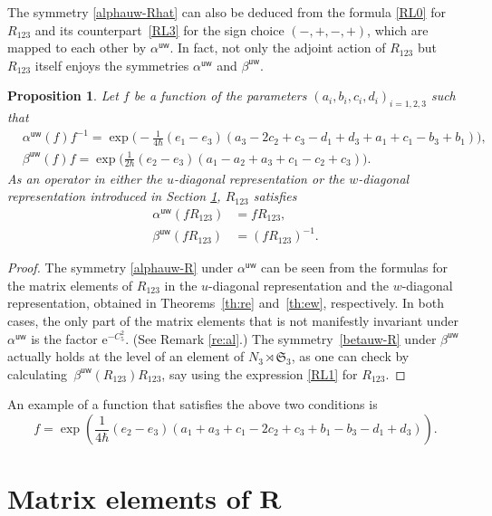 \documentclass[pdftex]{sigma}
\newcommand{\e}{{\mathrm e}}
\newcommand{\uu}{{\mathsf u}}
\newcommand{\ww}{{\mathsf w}}
\numberwithin{equation}{section}
\newtheorem{Proposition}[Theorem]{Proposition}
 { \theoremstyle{definition}
\newtheorem{Example}[Theorem]{Example}
\newtheorem{Remark}[Theorem]{Remark} }
\begin{document}
The symmetry \eqref{alphauw-Rhat} can also be deduced from the formula
\eqref{RL0} for $R_{123}$ and its counterpart~\eqref{RL3} for the sign
choice $(-,+,-,+)$, which are mapped to each other by $\alpha^{\uu\ww}$.
In fact, not only the adjoint action of $R_{123}$ but $R_{123}$ itself
enjoys the symmetries $\alpha^{\uu\ww}$ and $\beta^{\uu\ww}$.
\begin{Proposition}
 Let $f$ be a function of the parameters
 $(a_i, b_i, c_i, d_i)_{i=1,2,3}$ such that
 \begin{align} %
& \alpha^{\uu\ww}(f) f^{-1}
= \exp\biggl(-\frac{1}{4\hbar}
 (e_1 - e_3)(a_3 - 2c_2 + c_3 - d_1 + d_3 + a_1 + c_1 - b_3 + b_1)\biggr),
\nonumber
 \\
 &\beta^{\uu\ww} (f) f
=
 \exp\biggl(
 \frac{1}{2\hbar}
 (e_2 - e_3)(a_1 - a_2 + a_3 + c_1 - c_2 + c_3)
 \biggr).\label{alphauw-f}
 \end{align}
 As an operator in either the $u$-diagonal representation or the
 $w$-diagonal representation introduced in Section {\rm\ref{s:me}},
 $R_{123}$ satisfies
 \begin{align}
 \alpha^{\uu\ww} (f R_{123}) &= f R_{123},
 \label{alphauw-R}
 \\
 \beta^{\uu\ww} (f R_{123}) &= (f R_{123})^{-1}.
 \label{betauw-R}
 \end{align}
\end{Proposition}

\begin{proof}
 The symmetry \eqref{alphauw-R} under $\alpha^{\uu\ww}$ can be seen from
 the formulas for the matrix elements of $R_{123}$ in the
 $u$-diagonal representation and the $w$-diagonal representation,
 obtained in Theorems~\ref{th:re} and~\ref{th:ew},
 respectively. In both cases, the only part of the matrix elements
 that is not manifestly invariant under $\alpha^{\uu\ww}$ is the factor
 $\e^{-C_5^2}$. (See Remark \ref{re:al}.) The symmetry~\eqref{betauw-R} under $\beta^{\uu\ww}$ actually holds at the level of
 an element of $N_3 \rtimes \mathfrak{S}_3$, as one can check by
 calculating~${\beta^{\uu\ww}(R_{123}) R_{123}}$, say using the expression
 \eqref{RL1} for $R_{123}$.
\end{proof}

An example of a function that satisfies the above two conditions is
\[
 f
 =\exp\left(\frac{1}{4\hbar}
 (e_2 - e_3)(a_1 + a_3 + c_1 - 2c_2 + c_3 + b_1 - b_3 - d_1 + d_3)\right).
\]

\section[Matrix elements of R]{Matrix elements of $\boldsymbol{R}$}\label{s:me}
\end{document}
